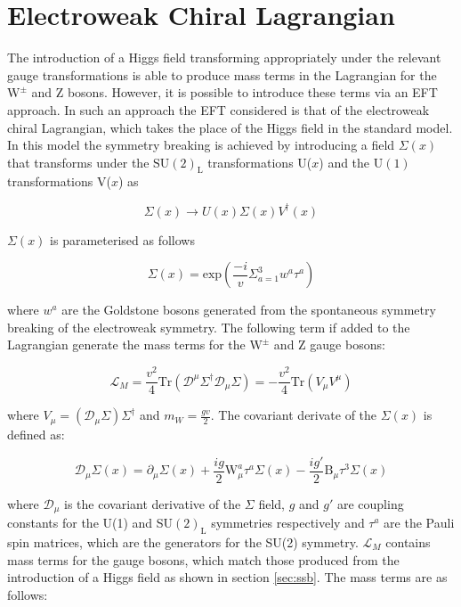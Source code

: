 \section{Electroweak Chiral Lagrangian}
The introduction of a Higgs field transforming appropriately under the relevant gauge transformations is able to produce mass terms in the Lagrangian for the $\text{W}^{\pm}$ and Z bosons.  However, it is possible to introduce these terms via an EFT approach.  In such an approach the EFT considered is that of the electroweak chiral Lagrangian, which takes the place of the Higgs field in the standard model.  In this model the symmetry breaking is achieved by introducing a field $\Sigma(x)$ that transforms under the $\text{SU}(2)_{\text{L}}$ transformations U($x$) and the $\text{U}(1)$ transformations V($x$) as

\begin{equation}
\Sigma(x) \rightarrow U(x) \Sigma(x) V^{\dagger}(x)
\end{equation}

$\Sigma(x)$ is parameterised as follows

\begin{equation}
\Sigma(x) = \text{exp} (\frac{-i}{v} \Sigma^{3}_{a=1} w^{a}\tau^{a})
\end{equation}

where $w^{a}$ are the Goldstone bosons generated from the spontaneous symmetry breaking of the electroweak symmetry.  The following term if added to the Lagrangian generate the mass terms for the $\text{W}^{\pm}$ and Z gauge bosons:

\begin{equation}
\mathcal{L}_{M} = \frac{v^{2}}{4} \text{Tr} (\mathcal{D}^{\mu} \Sigma^{\dagger} \mathcal{D}_{\mu} \Sigma) = -\frac{v^{2}}{4}\text{Tr}(V_{\mu} V^{\mu})
\end{equation}

where $V_{\mu} = (\mathcal{D}_{\mu}\Sigma) \Sigma^{\dagger}$ and $m_{W} = \frac{gv}{2}$.  The covariant derivate of the $\Sigma(x)$ is defined as:

\begin{equation}
\mathcal{D}_{\mu} \Sigma(x) = \partial_{\mu} \Sigma(x) + \frac{ig}{2}\text{W}_{\mu}^{a}\tau^{a}\Sigma(x) - \frac{ig'}{2}\text{B}_{\mu}\tau^{3}\Sigma(x)
\end{equation}

where $\mathcal{D}_{\mu}$ is the covariant derivative of the $\Sigma$ field, $g$ and $g'$ are coupling constants for the U(1) and SU$(2)_\text{L}$ symmetries respectively and $\tau^{a}$ are the Pauli spin matrices, which are the generators for the SU(2) symmetry.  $\mathcal{L}_{M}$ contains mass terms for the gauge bosons, which match those produced from the introduction of a Higgs field as shown in section \ref{sec:ssb}.  The mass terms are as follows:

